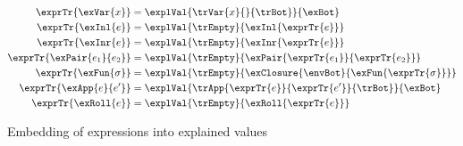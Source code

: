 \begin{figure}
\begin{align*}
\exprTr{\exVar{x}}
&=
\explVal{\trVar{x}{}{\trBot}}{\exBot}
\\
\exprTr{\exInl{e}}
&=
\explVal{\trEmpty}{\exInl{\exprTr{e}}}
\\
\exprTr{\exInr{e}}
&=
\explVal{\trEmpty}{\exInr{\exprTr{e}}}
\\
\exprTr{\exPair{e_1}{e_2}}
&=
\explVal{\trEmpty}{\exPair{\exprTr{e_1}}{\exprTr{e_2}}}
\\
\exprTr{\exFun{\sigma}}
&=
\explVal{\trEmpty}{\exClosure{\envBot}{\exFun{\exprTr{\sigma}}}}
\\
\exprTr{\exApp{e}{e'}}
&=
\explVal{\trApp{\exprTr{e}}{\exprTr{e'}}{\trBot}}{\exBot}
\\
\exprTr{\exRoll{e}}
&=
\explVal{\trEmpty}{\exRoll{\exprTr{e}}}
\end{align*}
\caption{Embedding of expressions into explained values}
\label{fig:self-explaining:trace-for-expr}
\end{figure}
